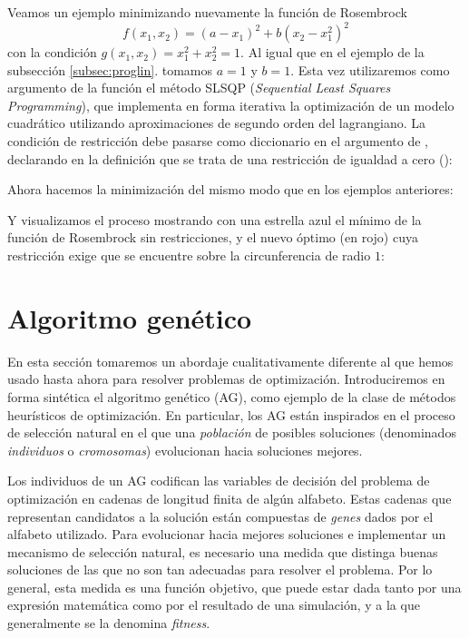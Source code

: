 Veamos un ejemplo minimizando nuevamente la función de Rosembrock 
\[ f(x_1, x_2) = (a - x_1)^2 + b (x_2 - x_1^2)^2 \]
con la condición $g(x_1, x_2) = x_1^2 + x_2^2 = 1$. Al igual que en el ejemplo de la subsección \ref{subsec:proglin}. tomamos $a = 1$ y $b = 1$. Esta vez utilizaremos como argumento de la función  el método SLSQP (\textit{Sequential Least Squares Programming}), que implementa en forma iterativa la optimización de un modelo cuadrático utilizando aproximaciones de segundo orden del lagrangiano. La condición de restricción debe pasarse como diccionario en el argumento  de , declarando en la definición que se trata de una restricción de igualdad a cero ():


Ahora hacemos la minimización del mismo modo que en los ejemplos anteriores:


Y visualizamos el proceso mostrando con una estrella azul el mínimo de la función de Rosembrock sin restricciones, y el nuevo óptimo (en rojo) cuya restricción exige que se encuentre sobre la circunferencia de radio $1$:


\section{Algoritmo genético}

En esta sección tomaremos un abordaje cualitativamente diferente al que hemos usado hasta ahora para resolver problemas de optimización. Introduciremos en forma sintética el algoritmo genético (AG), como ejemplo de la clase de métodos heurísticos de optimización. En particular, los AG están inspirados en el proceso de selección natural en el que una \textit{población} de posibles soluciones (denominados \textit{individuos} o \textit{cromosomas}) evolucionan hacia soluciones mejores.

Los individuos de un AG codifican las variables de decisión del problema de optimización en cadenas de longitud finita de algún alfabeto. Estas cadenas que representan candidatos a la solución están compuestas de \textit{genes} dados por el alfabeto utilizado. Para evolucionar hacia mejores soluciones e implementar un mecanismo de selección natural, es necesario una medida que distinga buenas soluciones de las que no son tan adecuadas para resolver el problema. Por lo general, esta medida es una función objetivo, que puede estar dada tanto por una expresión matemática como por el resultado de una simulación, y a la que generalmente se la denomina \textit{fitness}.

